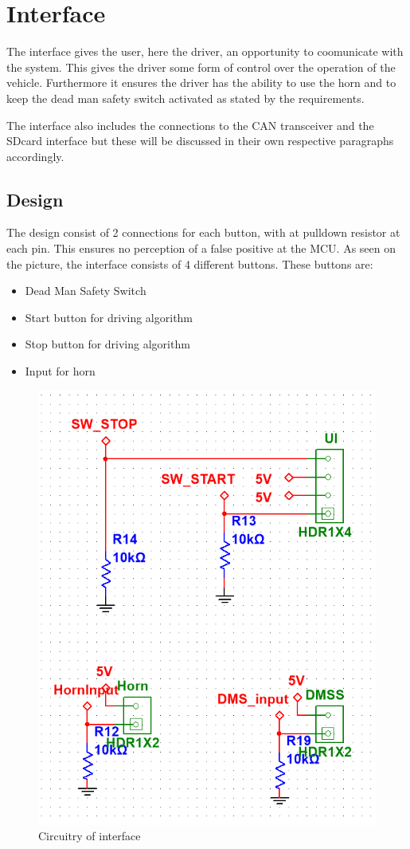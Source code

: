 \section{Interface}
The interface gives the user, here the driver, an opportunity to coomunicate with the system. This gives the driver some form of control over the operation of the vehicle. Furthermore it ensures the driver has the ability to use the horn and to keep the dead man safety switch activated as stated by the requirements.

The interface also includes the  connections to the CAN transceiver and the SDcard interface but these will be discussed in their own respective paragraphs accordingly.  
\subsection{Design}

The design consist of 2 connections for each button, with at pulldown resistor at each pin. This ensures no perception of a false positive at the MCU. As seen on the picture, the interface consists of 4 different buttons. These buttons are:

\begin{itemize}
	\item{Dead Man Safety Switch}
	\item{Start button for driving algorithm}
	\item{Stop button for driving algorithm}
	\item{Input for horn}
\end{itemize}

\begin{figure}[H]
	\centering
	\includegraphics[width=0.6\linewidth]{Hardware/Pictures/User_interface}
	\caption{Circuitry of interface}
	\label{fig:interface}
\end{figure}

